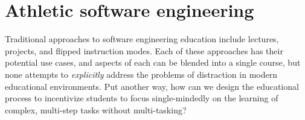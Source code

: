 \section{Athletic software engineering}%
\label{section:nutshell}


Traditional approaches to software engineering education include lectures, projects, and flipped instruction modes. Each of these approaches has their potential use cases, and aspects of each can be blended into a single course, but none attempts to {\em explicitly} address the problems of distraction in modern educational environments. Put another way, how can we design the educational process to incentivize students to focus single-mindedly on the learning of complex, multi-step tasks without multi-tasking?  


%
%
%


